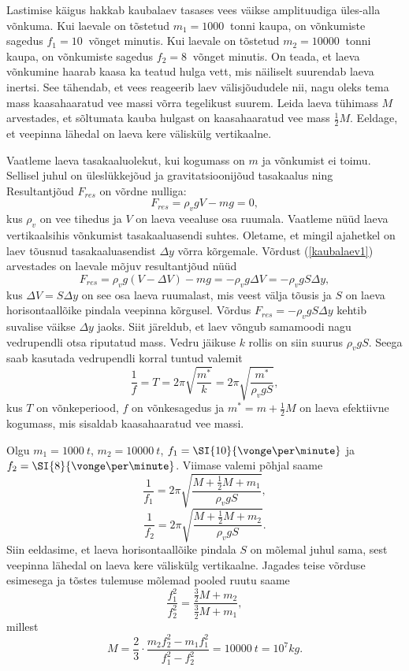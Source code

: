 
Lastimise käigus hakkab kaubalaev tasases vees väikse amplituudiga üles-alla võnkuma. Kui laevale on tõstetud $m_1 = \SI{1000}{}$ tonni kaupa, on võnkumiste sagedus $f_1 = \SI{10}{}$ võnget minutis. Kui laevale on tõstetud $m_2 = \SI{10000}{}$ tonni kaupa, on võnkumiste sagedus $f_2 = \SI{8}{}$ võnget minutis. On teada, et laeva võnkumine haarab kaasa ka teatud hulga vett, mis näiliselt suurendab laeva inertsi. See tähendab, et vees reageerib laev välisjõududele nii, nagu oleks tema mass kaasahaaratud vee massi võrra tegelikust suurem. Leida laeva tühimass $M$ arvestades, et sõltumata kauba hulgast on kaasahaaratud vee mass $\frac{1}{2}M$. Eeldage, et veepinna lähedal on laeva kere väliskülg vertikaalne.




\hint

\solu
Vaatleme laeva tasakaaluolekut, kui kogumass on $m$ ja võnkumist ei toimu. Sellisel juhul on üleslükkejõud ja gravitatsioonijõud tasakaalus ning Resultantjõud $F_{res}$ on võrdne nulliga:
\begin{equation}
F_{res}=\rho_vgV-mg=0,
\label{kaubalaev1}
\end{equation}
kus $\rho_v$ on vee tihedus ja $V$ on laeva veealuse osa ruumala. Vaatleme nüüd laeva vertikaalsihis võnkumist tasakaaluasendi suhtes. Oletame, et mingil ajahetkel on laev tõusnud tasakaaluasendist $\Delta y$ võrra kõrgemale. Võrdust (\ref{kaubalaev1}) arvestades on laevale mõjuv resultantjõud nüüd
\[F_{res}=\rho_vg(V-\Delta V)-mg=-\rho_vg\Delta V=-\rho_vgS\Delta y,\]
kus $\Delta V=S\Delta y$ on see osa laeva ruumalast, mis veest välja tõusis ja $S$ on laeva horisontaallõike pindala veepinna kõrgusel. Võrdus $F_{res}=-\rho_vgS\Delta y$ kehtib suvalise väikse $\Delta y$ jaoks. Siit järeldub, et laev võngub samamoodi nagu vedrupendli otsa riputatud mass. Vedru jäikuse $k$ rollis on siin suurus $\rho_vgS$. Seega saab kasutada vedrupendli korral tuntud valemit
\[\frac{1}{f}=T=2\pi\sqrt{\frac{m^*}{k}}=2\pi\sqrt{\frac{m^*}{\rho_vgS}},\]
kus $T$ on võnkeperiood, $f$ on võnkesagedus ja $m^*=m+\frac{1}{2}M$ on laeva efektiivne kogumass, mis sisaldab kaasahaaratud vee massi.

\DeclareSIUnit{}
Olgu $m_1=\SI{1000}{t}$, $m_2=\SI{10000}{t}$, $f_1=\SI{10}{\vonge \per \minute}$ ja $f_2=\SI{8}{\vonge \per \minute}$.
Viimase valemi põhjal saame
\[\frac{1}{f_1}=2\pi\sqrt{\frac{M+\frac{1}{2}M+m_1}{\rho_vgS}},\]
\[\frac{1}{f_2}=2\pi\sqrt{\frac{M+\frac{1}{2}M+m_2}{\rho_vgS}}.\]
Siin eeldasime, et laeva horisontaallõike pindala $S$ on mõlemal juhul sama, sest veepinna lähedal on laeva kere väliskülg vertikaalne.
Jagades teise võrduse esimesega ja tõstes tulemuse mõlemad pooled ruutu saame
\[\frac{f_1^2}{f_2^2}=\frac{\frac{3}{2}M+m_2}{\frac{3}{2}M+m_1},\]
millest
\[M=\frac{2}{3}\cdot\frac{m_2f_2^2-m_1f_1^2}{f_1^2-f_2^2}=\SI{10000}{t}=10^7\si{kg}.\]
\probend
